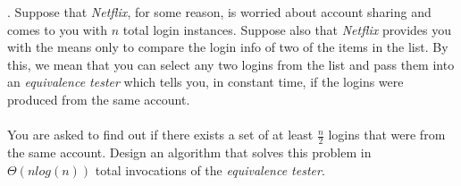 \documentclass[12pt]{article}
\newcounter{quesnum}
\newcommand{\question}[2][??]{
\begin{list}{\labelitemi}{\leftmargin=2em}
\item [\arabic{quesnum}.] {} {#2}
\end{list}
\addtocounter{quesnum}{1}
}
\begin{document}


\fi

\question[3]{
Suppose that \emph{Netflix}, for some reason, is worried about account sharing and comes to you with $n$ total login instances. Suppose also that \emph{Netflix} provides you with the means only to compare the login info of two of the items in the list. By this, we mean that you can select any two logins from the list and pass them into an \emph{equivalence tester} which tells you, in constant time, if the logins were produced from the same account.\\
\\
You are asked to find out if there exists a set of at least $\frac{n}{2}$ logins that were from the same account. Design an algorithm that solves this problem in $\Theta(nlog(n))$ total invocations of the \emph{equivalence tester}.
}




\end{document}
